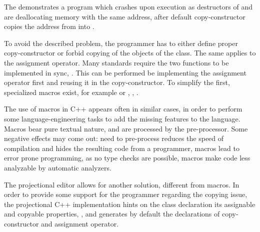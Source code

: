 
The  demonstrates a program which crashes upon execution as destructors of  and  are deallocating 
memory with the same address, after default copy-constructor copies the address from  into .

To avoid the described problem, the programmer has to either define proper copy-constructor or forbid copying of the objects of
the class. The same applies to the assignment operator. Many standards require the two functions to be implemented in sync, \cite{ooocpp}.
This can be performed be implementing the assignment operator first and reusing it in the copy-constructor. To simplify the first,
specialized macros exist, for example  or , \cite{googlecppstyle}, \cite{qobjref}.

The use of macros in C++ appears often in similar cases, in order to perform some language-engineering tasks to add the missing
features to the language. Macros bear pure textual nature, and are processed by the pre-processor. Some negative effects may 
come out: need to pre-process reduces the speed of compilation and hides the resulting code from a programmer, macros lead
to error prone programming, as no type checks are possible, macros make code less analyzable by automatic analyzers.



The projectional editor allows for another solution, different from macros.  In order to provide some support for the 
programmer regarding the copying issue, the projectional C++ implementation hints on the class declaration its 
assignable and copyable properties, , and generates by default the declarations of copy-constructor and assignment operator.










